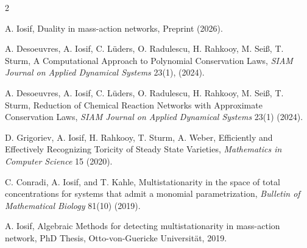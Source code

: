 \documentclass[11pt,a4paper]{article}
\begin{document}
\begin{sincabstract}
\begin{multicols}{2}
\begin{enumerate}[label={[\arabic*]},leftmargin=*]
\item A. Iosif, Duality in mass-action networks, Preprint (2026).
\item A. Desoeuvres, A. Iosif, C. Lüders, O. Radulescu, H. Rahkooy, M. Seiß, T. Sturm, A Computational Approach to Polynomial Conservation Laws, \textit{SIAM Journal on Applied Dynamical Systems} 23(1), (2024).
\item A. Desoeuvres, A. Iosif, C. Lüders, O. Radulescu, H. Rahkooy, M. Seiß, T. Sturm, Reduction of Chemical Reaction Networks with Approximate Conservation Laws, \textit{SIAM Journal on Applied Dynamical Systems} 23(1) (2024).
\item D. Grigoriev, A. Iosif, H. Rahkooy, T. Sturm, A. Weber, Efficiently and Effectively Recognizing Toricity of Steady State Varieties, \textit{Mathematics in Computer Science} 15 (2020).
\item C. Conradi, A. Iosif, and T. Kahle, Multistationarity in the space of total concentrations for systems that admit a monomial parametrization, \textit{Bulletin of Mathematical Biology} 81(10) (2019).
\item A. Iosif, Algebraic Methods for detecting multistationarity in mass-action network, PhD Thesis, Otto-von-Guericke Universität, 2019.
\end{enumerate}

\end{multicols}
\end{sincabstract}

\end{document}

